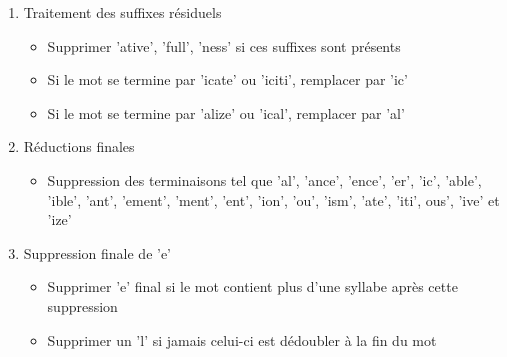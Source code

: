 \documentclass{rapport}
\begin{document}
\begin{enumerate}
\begin{itemize}
    \end{itemize}
    \item Traitement des suffixes résiduels
    \begin{itemize}
        \item Supprimer 'ative', 'full', 'ness' si ces suffixes sont présents
        \item Si le mot se termine par 'icate' ou 'iciti', remplacer par 'ic'
        \item Si le mot se termine par 'alize' ou 'ical', remplacer par 'al'
    \end{itemize}
    \item Réductions finales
    \begin{itemize}
        \item Suppression des terminaisons tel que 'al', 'ance', 'ence', 'er', 'ic', 'able', 'ible', 'ant', 'ement', 'ment', 'ent', 'ion', 'ou', 'ism', 'ate', 'iti', ous', 'ive' et 'ize'
    \end{itemize}
    \item Suppression finale de 'e'
    \begin{itemize}
        \item Supprimer 'e' final si le mot contient plus d'une syllabe après cette suppression
        \item Supprimer un 'l' si jamais celui-ci est dédoubler à la fin du mot
    \end{itemize}
\end{enumerate}
\end{document}
